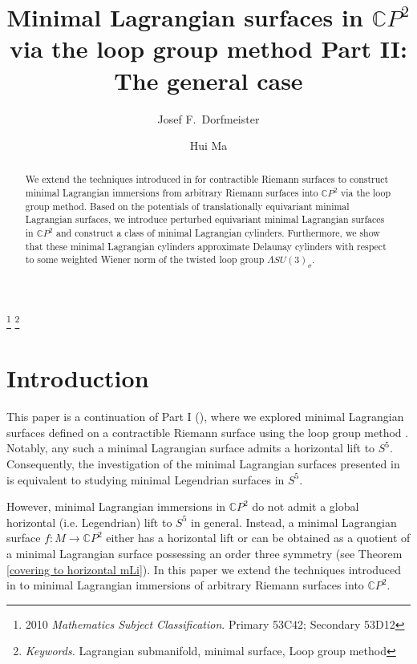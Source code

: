 \documentclass[a4paper,11pt]{amsart}
\theoremstyle{definition}
\numberwithin{equation}{section}
\newcommand{\C}{\mathbb{C}}
\begin{document}
\title[Minimal Lagrangian surfaces in $\mathbb{C}P^2$ : Part II ]
{Minimal Lagrangian surfaces in $\mathbb{C}P^2$ via the loop group method   Part II: The general case}


\author{Josef F.~Dorfmeister}
\address{Fakult\"{a}t F\"{u}r Mathematik, TU-M\"{u}nchen, Boltzmann Str. 3,
D-85747, Garching, Germany}
\author{Hui Ma}
\address{Department of Mathematical Sciences, Tsinghua University,
Beijing 100084, P.R. China} 
\thanks{2010 {\it Mathematics Subject Classification}. Primary 
 53C42; Secondary 53D12}
\thanks{{\it Keywords.} Lagrangian submanifold, minimal surface, Loop group method}

\begin{abstract} 
 We extend the techniques introduced in \cite{DoMaB1} for contractible Riemann surfaces to construct minimal Lagrangian immersions from arbitrary Riemann surfaces into $\mathbb{C}P^2$ via  the loop group method.
Based on the potentials of translationally equivariant minimal Lagrangian surfaces, we introduce perturbed equivariant  minimal Lagrangian surfaces in $\C P^2$ and 
construct  a  class of minimal Lagrangian cylinders. Furthermore, we show that these minimal Lagrangian cylinders  approximate  Delaunay cylinders with respect to some weighted Wiener norm of the twisted loop group $\Lambda SU(3)_{\sigma}$. 
\end{abstract}

\maketitle
 
\tableofcontents

\section{Introduction}

This paper is a continuation of Part I (\cite{DoMaB1}), where we explored minimal Lagrangian surfaces defined on a contractible Riemann surface using the loop group method \cite{DPW}.
Notably, any such a minimal Lagrangian surface admits a horizontal lift to $S^5$. 
Consequently,  the investigation of  the minimal Lagrangian surfaces presented in \cite{DoMaB1}  is equivalent to  studying  minimal Legendrian surfaces in $S^5$. 
 

However, minimal Lagrangian immersions in $\C P^2$ do not admit  a global horizontal (i.e. Legendrian) lift to $S^5$ in general. Instead, a minimal Lagrangian surface $f: M \rightarrow \mathbb{C}P^2$ either has a horizontal lift or can be obtained as a quotient of a minimal Lagrangian surface possessing an order three  symmetry (see Theorem \ref{covering to horizontal mLi}).  In this paper we extend the techniques introduced in \cite{DoMaB1}  to minimal Lagrangian immersions of arbitrary Riemann surfaces into $\mathbb{C}P^2$. 
\end{document}
